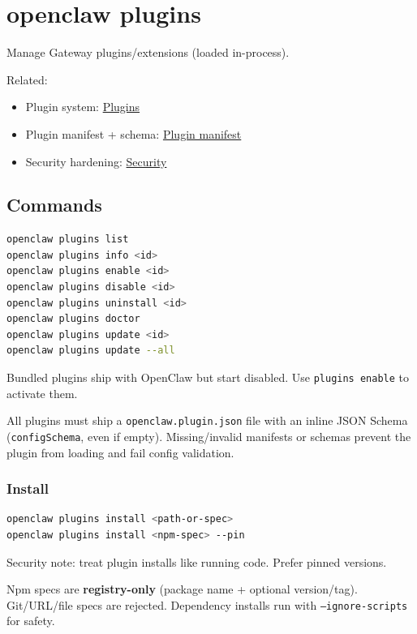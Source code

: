 \clearpage

\section{openclaw plugins}


Manage Gateway plugins/extensions (loaded in-process).

Related:

\begin{itemize}
  \item Plugin system: \href{/tools/plugin}{Plugins}
  \item Plugin manifest + schema: \href{/plugins/manifest}{Plugin manifest}
  \item Security hardening: \href{/gateway/security}{Security}
\end{itemize}


\subsection{Commands}


\begin{lstlisting}[language=bash]
openclaw plugins list
openclaw plugins info <id>
openclaw plugins enable <id>
openclaw plugins disable <id>
openclaw plugins uninstall <id>
openclaw plugins doctor
openclaw plugins update <id>
openclaw plugins update --all
\end{lstlisting}


Bundled plugins ship with OpenClaw but start disabled. Use \texttt{plugins enable} to
activate them.

All plugins must ship a \texttt{openclaw.plugin.json} file with an inline JSON Schema
(\texttt{configSchema}, even if empty). Missing/invalid manifests or schemas prevent
the plugin from loading and fail config validation.

\subsubsection{Install}


\begin{lstlisting}[language=bash]
openclaw plugins install <path-or-spec>
openclaw plugins install <npm-spec> --pin
\end{lstlisting}


Security note: treat plugin installs like running code. Prefer pinned versions.

Npm specs are \textbf{registry-only} (package name + optional version/tag). Git/URL/file
specs are rejected. Dependency installs run with \texttt{--ignore-scripts} for safety.

